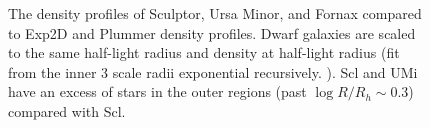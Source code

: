 \begin{figure}
\centering
{}
\caption[Classical dwarf density profiles]{The density profiles of
Sculptor, Ursa Minor, and Fornax compared to Exp2D and Plummer density
profiles. Dwarf galaxies are scaled to the same half-light radius and
density at half-light radius (fit from the inner 3 scale radii
exponential recursively. ). Scl and UMi have an excess of stars in the
outer regions (past \(\log R/R_h \sim 0.3\)) compared with
Scl.}\label{fig:classical_dwarfs_densities}
\end{figure}

